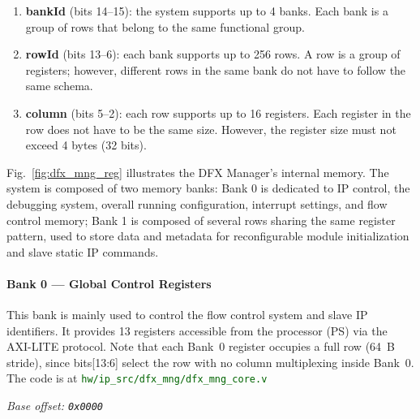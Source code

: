 \documentclass{cernatsnote}
\newcommand{\addr}[1]{\texttt{\small #1}}
\begin{document}
\begin{enumerate}
  \item \textbf{bankId} (bits 14--15): the system supports up to 4 banks. Each bank is a group of rows that belong to the same functional group.
  \item \textbf{rowId} (bits 13--6): each bank supports up to 256 rows. A row is a group of registers; however, different rows in the same bank do not have to follow the same schema.
  \item \textbf{column} (bits 5--2): each row supports up to 16 registers. Each register in the row does not have to be the same size. However, the register size must not exceed 4 bytes (32 bits).
\end{enumerate}

Fig.~\ref{fig:dfx_mng_reg} illustrates the DFX Manager's internal memory. The system is composed of two memory banks: Bank 0 is dedicated to IP control, the debugging system, overall running configuration, interrupt settings, and flow control memory; Bank 1 is composed of several rows sharing the same register pattern, used to store data and metadata for reconfigurable module initialization and slave static IP commands.
 
\paragraph{\textbf{Bank 0 — Global Control Registers}}

This bank is mainly used to control the flow control system and slave IP identifiers. It provides 13 registers accessible from the processor (PS) via the AXI-LITE protocol. Note that each Bank~0 register occupies a full row (64~B stride), since bits[13:6] select the row with no column multiplexing inside Bank~0. The code is at \textcolor{darkgreen}{\texttt{hw/ip\_src/dfx\_mng/dfx\_mng\_core.v}}

\vspace{1.0em}


\textit{Base offset: \addr{0x0000}}

\vspace{0.5em}
\end{document}
